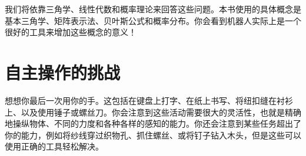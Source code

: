 
我们将依靠三角学、线性代数和概率理论来回答这些问题。本书使用的具体概念是基本三角学、矩阵表示法、贝叶斯公式和概率分布。你会看到机器人实际上是一个很好的工具来增加这些概念的意义！


\section{自主操作的挑战}


想想你最后一次用你的手。这包括在键盘上打字、在纸上书写、将纽扣缝在衬衫上、以及使用锤子或螺丝刀。你会注意到这些活动需要很大的灵活性，也就是精确地操纵物体、不同的力度和各种各样的感知的能力。你还会注意到某些任务超出了你的能力，例如将纱线穿过织物孔、抓住螺丝、或将钉子钻入木头，但是这些可以使用正确的工具轻松解决。


